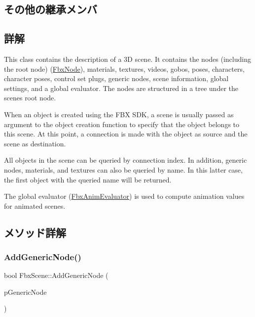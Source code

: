 \subsection*{その他の継承メンバ}


\subsection{詳解}
This class contains the description of a 3D scene. It contains the nodes (including the root node) (\hyperlink{class_fbx_node}{Fbx\+Node}), materials, textures, videos, gobos, poses, characters, character poses, control set plugs, generic nodes, scene information, global settings, and a global evaluator. The nodes are structured in a tree under the scene\textquotesingle{}s root node.

When an object is created using the F\+BX S\+DK, a scene is usually passed as argument to the object creation function to specify that the object belongs to this scene. At this point, a connection is made with the object as source and the scene as destination.

All objects in the scene can be queried by connection index. In addition, generic nodes, materials, and textures can also be queried by name. In this latter case, the first object with the queried name will be returned.

The global evaluator (\hyperlink{class_fbx_anim_evaluator}{Fbx\+Anim\+Evaluator}) is used to compute animation values for animated scenes. 

\subsection{メソッド詳解}
\mbox{\label{class_fbx_scene_aedfcc888eda10e083a10646875390d6d}} 
\subsubsection{\texorpdfstring{Add\+Generic\+Node()}{AddGenericNode()}}
{\footnotesize\ttfamily bool Fbx\+Scene\+::\+Add\+Generic\+Node (\begin{DoxyParamCaption}\item[{\hyperlink{class_fbx_generic_node}{Fbx\+Generic\+Node} $\ast$}]{p\+Generic\+Node }\end{DoxyParamCaption})}

